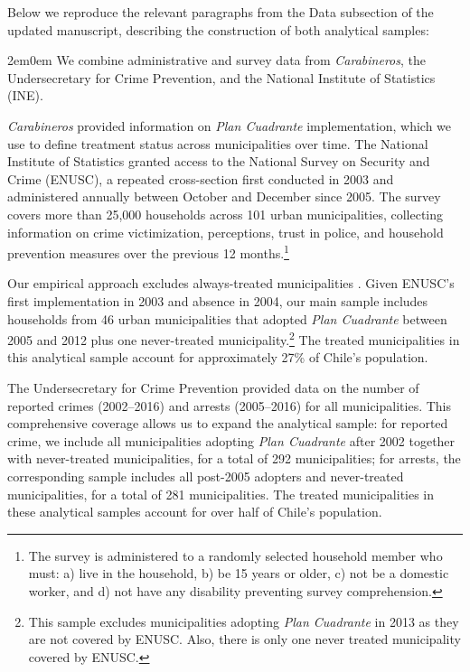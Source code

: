 Below we reproduce the relevant paragraphs from the Data subsection of the updated manuscript, describing the construction of both analytical samples:

\begin{adjustwidth}{2em}{0em}
We combine administrative and survey data from \emph{Carabineros}, the Undersecretary for Crime Prevention, and the National Institute of Statistics (INE).

\emph{Carabineros} provided information on \emph{Plan Cuadrante} implementation, which we use to define treatment status across municipalities over time. The National Institute of Statistics granted access to the National Survey on Security and Crime (ENUSC), a repeated cross-section first conducted in 2003 and administered annually between October and December since 2005. The survey covers more than 25,000 households across 101 urban municipalities, collecting information on crime victimization, perceptions, trust in police, and household prevention measures over the previous 12 months.\footnote{The survey is administered to a randomly selected household member who must: a) live in the household, b) be 15 years or older, c) not be a domestic worker, and d) not have any disability preventing survey comprehension.}

Our empirical approach excludes always-treated municipalities \citep{Callaway}. Given ENUSC's first implementation in 2003 and absence in 2004, our main sample includes households from 46 urban municipalities that adopted \emph{Plan Cuadrante} between 2005 and 2012 plus one never-treated municipality.\footnote{This sample excludes municipalities adopting \emph{Plan Cuadrante} in 2013 as they are not covered by ENUSC. Also, there is only one never treated municipality covered by ENUSC.} The treated municipalities in this analytical sample account for approximately 27\% of Chile's population.

The Undersecretary for Crime Prevention provided data on the number of reported crimes (2002--2016) and arrests (2005--2016) for all municipalities. This comprehensive coverage allows us to expand the analytical sample: for reported crime, we include all municipalities adopting \emph{Plan Cuadrante} after 2002 together with never-treated municipalities, for a total of 292 municipalities; for arrests, the corresponding sample includes all post-2005 adopters and never-treated municipalities, for a total of 281 municipalities. The treated municipalities in these analytical samples account for over half of Chile's population.


\end{adjustwidth}
